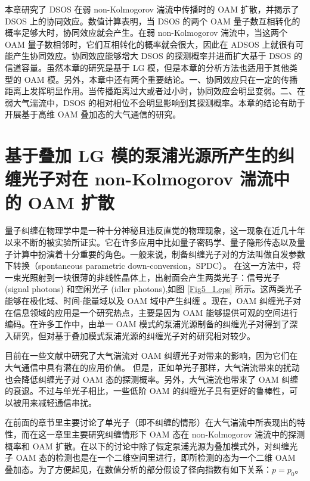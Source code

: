 \documentclass[master]{thesis-uestc}
\begin{document}
本章研究了 DSOS 在弱 non-Kolmogorov 湍流中传播时的 OAM 扩散，并揭示了 DSOS 上的协同效应。数值计算表明，当 DSOS 的两个 OAM 量子数互相转化的概率足够大时，协同效应就会产生。在弱 non-Kolmogorov 湍流中，当这两个 OAM 量子数相邻时，它们互相转化的概率就会很大，因此在 ADSOS 上就很有可能产生协同效应。协同效应能够增大 DSOS 的探测概率并进而扩大基于 DSOS 的信道容量。虽然本章的研究是基于 LG 模，但是本章的分析方法也适用于其他类型的 OAM 模。另外，本章中还有两个重要结论。一、协同效应只在一定的传播距离上发挥明显作用。当传播距离过大或者过小时，协同效应会明显变弱。二、在弱大气湍流中，DSOS 的相对相位不会明显影响到其探测概率。本章的结论有助于开展基于高维 OAM 叠加态的大气通信的研究。


\chapter{基于叠加 LG 模的泵浦光源所产生的纠缠光子对在 non-Kolmogorov 湍流中的 OAM 扩散}

量子纠缠在物理学中是一种十分神秘且违反直觉的物理现象，这一现象在近几十年以来不断的被实验所证实。它在许多应用中比如量子密码学、量子隐形传态以及量子计算中扮演着十分重要的角色。一般来说，制备纠缠光子对的方法叫做自发参数下转换（spontaneous parametric down-conversion，SPDC）。 在这一方法中，将一束光照射到一块很薄的非线性晶体上，出射面会产生两类光子：信号光子 (signal photons) 和空闲光子 (idler photons),如图 \ref{Fig5_1.eps} 所示。这两类光子能够在极化域、时间-能量域以及 OAM 域中产生纠缠 \citeup{}。现在，OAM 纠缠光子对在信息领域的应用是一个研究热点，主要是因为 OAM 能够提供可观的空间进行编码。在许多工作中，由单一 OAM 模式的泵浦光源制备的纠缠光子对得到了深入研究，但对基于叠加模式泵浦光源的纠缠光子对的研究相对较少。

目前在一些文献中研究了大气湍流对 OAM 纠缠光子对带来的影响，因为它们在大气通信中具有潜在的应用价值\citeup{}。 但是，正如单光子那样，大气湍流带来的扰动也会降低纠缠光子对 OAM 态的探测概率。另外，大气湍流也带来了 OAM 纠缠的衰退。不过与单光子相比，一些低阶 OAM 的纠缠光子具有更好的鲁棒性，可以被用来减轻通信串扰。


在前面的章节里主要讨论了单光子（即不纠缠的情形）在大气湍流中所表现出的特性，而在这一章里主要研究纠缠情形下 OAM 态在 non-Kolmogorov 湍流中的探测概率和 OAM 扩散。在以下的讨论中除了假定泵浦光源为叠加模式外，对纠缠光子 OAM 态的检测也是在一个二维空间里进行，即所检测的态为一个二维 OAM 叠加态。为了方便起见，在数值分析的部分假设了径向指数有如下关系：$p=p_0$。
\end{document}

